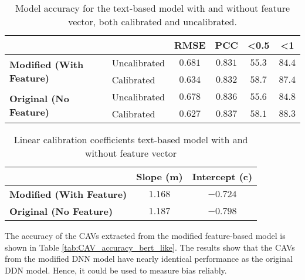 \begin{table}[H]
    \centering
    \begin{tabular}{|l|l|c|c|c|c|}
        \hline
        \multicolumn{2}{|l|}{\textbf{}} & \textbf{RMSE} & \textbf{PCC} & \textbf{\textless 0.5} & \textbf{\textless 1}          \\ \hline
        \multirow{2}{*}{\textbf{Modified (With Feature)}}
                                        & Uncalibrated  & $0.681$      & $0.831$                & $55.3$               & $84.4$ \\ \cline{2-6}
                                        & Calibrated    & $0.634$      & $0.832$                & $58.7$               & $87.4$ \\ \hline
        \multirow{2}{*}{\textbf{Original (No Feature)}}
                                        & Uncalibrated  & $0.678$      & $0.836$                & $55.6$               & $84.8$ \\ \cline{2-6}
                                        & Calibrated    & $0.627$      & $0.837$                & $58.1$               & $88.3$ \\ \hline
    \end{tabular}
    \caption{Model accuracy for the text-based model with and without feature vector, both calibrated and uncalibrated.}
    \label{tab:model_accuracy_deep_fusion}
\end{table}


\begin{table}[H]
    \centering
    \begin{tabular}{|l|c|c|}
        \hline
        \textbf{}                        & \textbf{Slope (m)} & \textbf{Intercept (c)} \\ \hline
        \textbf{Modified (With Feature)} & $1.168$            & $-0.724$               \\ \hline
        \textbf{Original (No Feature)}   & $1.187$            & $-0.798$               \\ \hline
    \end{tabular}
    \caption{Linear calibration coefficients text-based model with and without feature vector}
    \label{tab:linear_regression_coefficients_deep_fusion}
\end{table}

The accuracy of the CAVs extracted from the modified feature-based model is shown in Table \ref{tab:CAV_accuracy_bert_like}. The results show that the CAVs from the modified DNN model have nearly identical performance as the original DDN model. Hence, it could be used to measure bias reliably.

